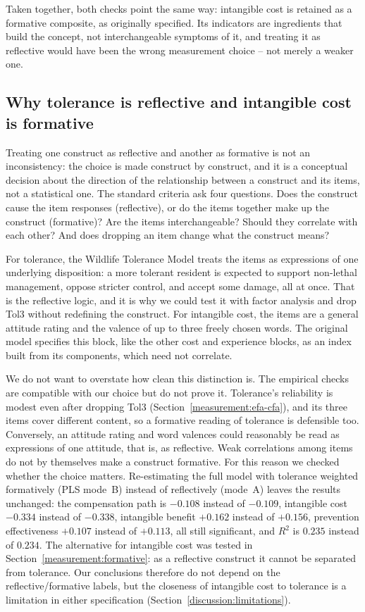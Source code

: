 Taken together, both checks point the same way: intangible cost is retained
as a formative composite, as originally specified. Its indicators are
ingredients that build the concept, not interchangeable symptoms of it, and
treating it as reflective would have been the wrong measurement choice --
not merely a weaker one.

\subsection{Why tolerance is reflective and intangible cost is formative}
\label{measurement:why-different}

Treating one construct as reflective and another as formative is not an
inconsistency: the choice is made construct by construct, and it is a
conceptual decision about the direction of the relationship between a
construct and its items, not a statistical one. The standard criteria
\citep{Jarvis2003} ask four questions. Does the construct cause the item
responses (reflective), or do the items together make up the construct
(formative)? Are the items interchangeable? Should they correlate with
each other? And does dropping an item change what the construct means?

For tolerance, the Wildlife Tolerance Model \citep{Kansky2016} treats the
items as expressions of one underlying disposition: a more tolerant resident
is expected to support non-lethal management, oppose stricter control, and
accept some damage, all at once. That is the reflective logic, and it is why
we could test it with factor analysis and drop Tol3 without redefining the
construct. For intangible cost, the items are a general attitude rating and
the valence of up to three freely chosen words. The original model specifies
this block, like the other cost and experience blocks, as an index built
from its components, which need not correlate.

We do not want to overstate how clean this distinction is. The empirical
checks are compatible with our choice but do not prove it. Tolerance's
reliability is modest even after dropping Tol3
(Section~\ref{measurement:efa-cfa}), and its three items cover different
content, so a formative reading of tolerance is defensible too. Conversely,
an attitude rating and word valences could reasonably be read as expressions of
one attitude, that is, as reflective. Weak correlations among items do not by themselves make a
construct formative. For this reason we checked whether the choice matters.
Re-estimating the full model with tolerance weighted formatively (PLS mode~B)
instead of reflectively (mode~A) leaves the results unchanged: the
compensation path is $-0.108$ instead of $-0.109$, intangible cost $-0.334$
instead of $-0.338$, intangible benefit $+0.162$ instead of $+0.156$,
prevention effectiveness $+0.107$ instead of $+0.113$, all still
significant, and $R^2$ is $0.235$ instead of $0.234$. The alternative
for intangible cost was tested in Section~\ref{measurement:formative}: as a
reflective construct it cannot be separated from tolerance. Our conclusions
therefore do not depend on the reflective/formative labels, but the closeness
of intangible cost to tolerance is a limitation in either specification
(Section~\ref{discussion:limitations}).

